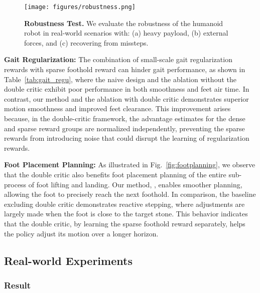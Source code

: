 

\begin{figure*}[t]
    \centering
    \texttt{[image: figures/robustness.png]}
    \caption{\textbf{Robustness Test.} We evaluate the robustness of the humanoid robot in real-world scenarios with: (a) heavy payload, (b) external forces, and (c) recovering from missteps.}
    \label{fig:robustness}
\end{figure*}


\textbf{Gait Regularization:} The combination of small-scale gait regularization rewards with sparse foothold reward can hinder gait performance, as shown in Table~\ref{tab:gait_regu}, where the naive design and the ablation without the double critic exhibit poor performance in both smoothness and feet air time. In contrast, our method and the ablation with double critic demonstrates superior motion smoothness and improved feet clearance. This improvement arises because, in the double-critic framework, the advantage estimates for the dense and sparse reward groups are normalized independently, preventing the sparse rewards from introducing noise that could disrupt the learning of regularization rewards.

\textbf{Foot Placement Planning:} As illustrated in Fig.~\ref{fig:footplanning}, we observe that the double critic also benefits foot placement planning of the entire sub-process of foot lifting and landing. Our method, \beamdojo, enables smoother planning, allowing the foot to precisely reach the next foothold. In comparison, the baseline excluding double critic demonstrates reactive stepping, where adjustments are largely made when the foot is close to the target stone. This behavior indicates that the double critic, by learning the sparse foothold reward separately, helps the policy adjust its motion over a longer horizon.


\subsection{Real-world Experiments}

\subsubsection{Result}

